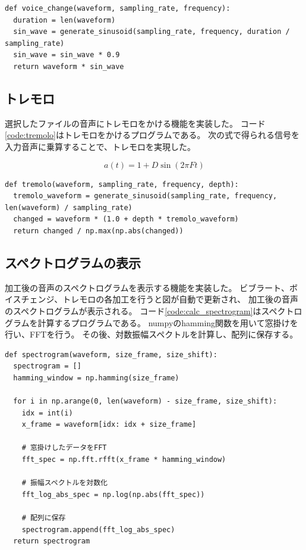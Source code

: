 \documentclass[a4paper,11pt]{jsarticle}
\begin{document}
\begin{lstlisting}[caption=ボイスチェンジ,label=code:voice_change]
def voice_change(waveform, sampling_rate, frequency):
  duration = len(waveform)
  sin_wave = generate_sinusoid(sampling_rate, frequency, duration / sampling_rate)
  sin_wave = sin_wave * 0.9
  return waveform * sin_wave
\end{lstlisting}

\subsection{トレモロ}
選択したファイルの音声にトレモロをかける機能を実装した。
コード\ref{code:tremolo}はトレモロをかけるプログラムである。
次の式で得られる信号を入力音声に乗算することで、トレモロを実現した。

\begin{equation}
  a(t) = 1 + D \sin(2 \pi F t)
\end{equation}


\begin{lstlisting}[caption=トレモロ,label=code:tremolo]
def tremolo(waveform, sampling_rate, frequency, depth):
  tremolo_waveform = generate_sinusoid(sampling_rate, frequency, len(waveform) / sampling_rate)
  changed = waveform * (1.0 + depth * tremolo_waveform)
  return changed / np.max(np.abs(changed))
\end{lstlisting}

\subsection{スペクトログラムの表示}
加工後の音声のスペクトログラムを表示する機能を実装した。
ビブラート、ボイスチェンジ、トレモロの各加工を行うと図が自動で更新され、
加工後の音声のスペクトログラムが表示される。
コード\ref{code:calc_spectrogram}はスペクトログラムを計算するプログラムである。
numpyのhamming関数を用いて窓掛けを行い、FFTを行う。
その後、対数振幅スペクトルを計算し、配列に保存する。

\begin{lstlisting}[caption=スペクトログラム計算,label=code:calc_spectrogram]
def spectrogram(waveform, size_frame, size_shift):
  spectrogram = []
  hamming_window = np.hamming(size_frame)

  for i in np.arange(0, len(waveform) - size_frame, size_shift):
    idx = int(i)
    x_frame = waveform[idx: idx + size_frame]

    # 窓掛けしたデータをFFT
    fft_spec = np.fft.rfft(x_frame * hamming_window)

    # 振幅スペクトルを対数化
    fft_log_abs_spec = np.log(np.abs(fft_spec))

    # 配列に保存
    spectrogram.append(fft_log_abs_spec)
  return spectrogram
\end{lstlisting}
\end{document}
